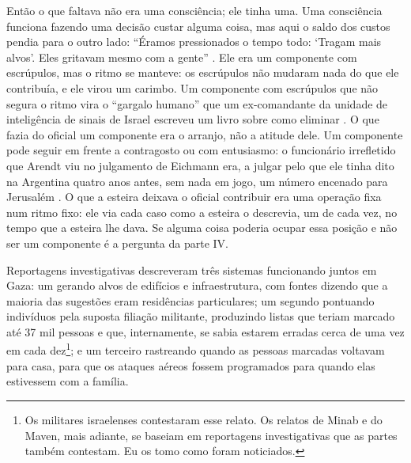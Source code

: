 Então o que faltava não era uma consciência; ele tinha uma. Uma consciência funciona fazendo uma decisão custar alguma coisa, mas aqui o saldo dos custos pendia para o outro lado: “Éramos pressionados o tempo todo: ‘Tragam mais alvos’. Eles gritavam mesmo com a gente” \autocite{abraham2024lavender}. Ele era um componente com escrúpulos, mas o ritmo se manteve: os escrúpulos não mudaram nada do que ele contribuía, e ele virou um carimbo. Um componente com escrúpulos que não segura o ritmo vira o “gargalo humano” que um ex-comandante da unidade de inteligência de sinais de Israel escreveu um livro sobre como eliminar \autocite{ys2021humanmachine}. O que fazia do oficial um componente era o arranjo, não a atitude dele. Um componente pode seguir em frente a contragosto ou com entusiasmo: o funcionário irrefletido que Arendt viu no julgamento de Eichmann \autocite{arendt1963eichmann} era, a julgar pelo que ele tinha dito na Argentina quatro anos antes, sem nada em jogo, um número encenado para Jerusalém \autocite{stangneth2014eichmann}. O que a esteira deixava o oficial contribuir era uma operação fixa num ritmo fixo: ele via cada caso como a esteira o descrevia, um de cada vez, no tempo que a esteira lhe dava. Se alguma coisa poderia ocupar essa posição e não ser um componente é a pergunta da parte IV.

Reportagens investigativas descreveram três sistemas funcionando juntos em Gaza: um gerando alvos de edifícios e infraestrutura, com fontes dizendo que a maioria das sugestões eram residências particulares; um segundo pontuando indivíduos pela suposta filiação militante, produzindo listas que teriam marcado até 37 mil pessoas e que, internamente, se sabia estarem erradas cerca de uma vez em cada dez\footnote{Os militares israelenses contestaram esse relato. Os relatos de Minab e do Maven, mais adiante, se baseiam em reportagens investigativas que as partes também contestam. Eu os tomo como foram noticiados.}; e um terceiro rastreando quando as pessoas marcadas voltavam para casa, para que os ataques aéreos fossem programados para quando elas estivessem com a família.


